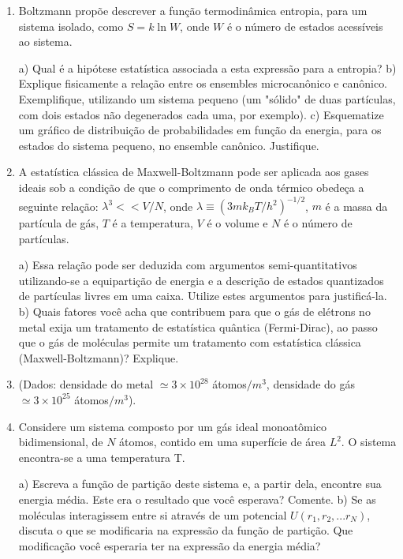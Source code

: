 \begin{enumerate}[start=1,label={\bfseries Q\arabic*.}]
\item Boltzmann propõe descrever a função termodinâmica entropia, para um sistema isolado, como $S = k \operatorname{ln} W$, onde $W$ é o número de estados acessíveis ao sistema.

  a) Qual é a hipótese estatística associada a esta expressão para a entropia?
  b) Explique fisicamente a relação entre os ensembles microcanônico e canônico. Exemplifique, utilizando um sistema pequeno (um "sólido" de duas partículas, com dois estados não degenerados cada uma, por exemplo).
  c) Esquematize um gráfico de distribuição de probabilidades em função da energia, para os estados do sistema pequeno, no ensemble canônico. Justifique.



\item A estatística clássica de Maxwell-Boltzmann pode ser aplicada aos gases ideais sob a condição de que o comprimento de onda térmico obedeça a seguinte relação: $\lambda^{3} << V/N$, onde $\lambda \equiv  \left( 3mk_{B} T / h^{2} \right)^{-1/2}$, $m$ é a massa da partícula de gás, $T$ é a temperatura, $V$ é o volume e $N$ é o número de partículas.

  a) Essa relação pode ser deduzida com argumentos semi-quantitativos utilizando-se a equipartição de energia e a descrição de estados quantizados de partículas livres em uma caixa. Utilize estes argumentos para justificá-la.
  b) Quais fatores você acha que contribuem para que o gás de elétrons no metal exija um tratamento de estatística quântica (Fermi-Dirac), ao passo que o gás de moléculas permite um tratamento com estatística clássica (Maxwell-Boltzmann)? Explique.
  \item[] (Dados: densidade do metal $\simeq 3 \times 10^{28}$ átomos$/m^{3}$, densidade do gás $\simeq 3 \times 10^{25}$ átomos$/m^{3}$).





\item Considere um sistema composto por um gás ideal monoatômico bidimensional, de $N$ átomos, contido em uma superfície de área $L^{2}$. O sistema encontra-se a uma temperatura T.

  a) Escreva a função de partição deste sistema e, a partir dela, encontre sua energia média. Este era o resultado que você esperava? Comente.
  b) Se as moléculas interagissem entre si através de um potencial $U(r_{1}, r_{2},...r_{N})$, discuta o que se modificaria na expressão da função de partição. Que modificação você esperaria ter na expressão da energia média?




\end{enumerate}
